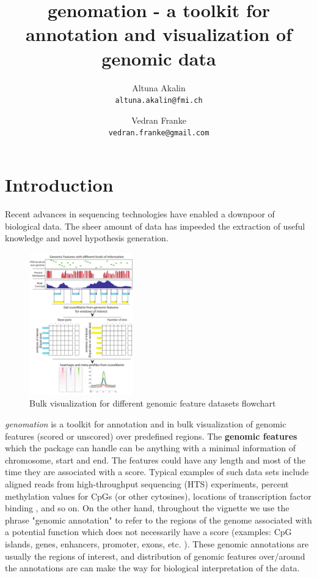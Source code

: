\documentclass{article}\usepackage[]{graphicx}\usepackage[]{color}
\title{genomation - a toolkit for annotation and visualization of genomic data}
\author{Altuna Akalin\\ \texttt{altuna.akalin@fmi.ch}\\
\and
Vedran Franke \\ \texttt{vedran.franke@gmail.com} }
\newcommand{\Rpackage}[1]{{\textit{#1}}}
\begin{document}
\maketitle
\tableofcontents
\newpage
\section{Introduction}

Recent advances in sequencing technologies have enabled a downpoor of biological data. The sheer amount of data has impeeded the extraction of useful knowledge and novel hypothesis generation.
\begin{figure}
 \vspace{-60pt}
  \begin{center}
    \includegraphics[width=0.4\textwidth]{Figures/genomationFlowChart1.pdf}
  \end{center}
  \caption{Bulk visualization for different genomic feature datasets flowchart}
   \vspace{-40pt}
\end{figure} 
\Rpackage{genomation} is a toolkit for annotation and in bulk visualization of 
genomic features (scored or unscored) over predefined regions. The \textbf{genomic features} which the package can handle can be anything with a minimal information of chromosome, start and end. The features could have any length and most of the time they are associated with a score. 
Typical examples of such data sets include aligned reads from high-throughput sequencing (HTS) experiments, percent methylation values for CpGs (or other cytosines), locations of transcription factor binding , and so on. On the other hand, throughout the vignette we use the phrase "genomic annotation" to refer to the regions of the genome associated with a potential function which does not necessarily have a score (examples: CpG islands, genes, enhancers, promoter, exons, etc. ). These genomic annotations are usually the regions of interest, and distribution of genomic features over/around the annotations are can make the way for biological interpretation of the data.
\end{document}
